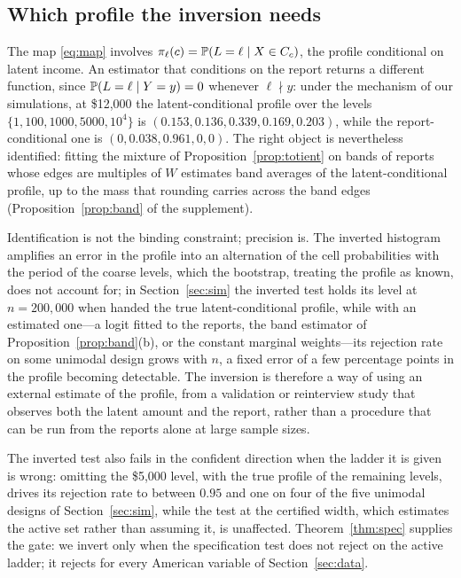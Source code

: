 \subsection{Which profile the inversion needs}

The map \eqref{eq:map} involves $\pi_\ell(c)=\mathbb{P}(L=\ell\mid X\in C_c)$, the profile conditional on latent income. An estimator that conditions on the report returns a different function, since $\mathbb{P}(L=\ell\mid Y=y)=0$ whenever $\ell\nmid y$: under the mechanism of our simulations, at \$12{,}000 the latent-conditional profile over the levels $\{1,\allowbreak 100,\allowbreak 1000,\allowbreak 5000,\allowbreak 10^4\}$ is $(0.153,\allowbreak 0.136,\allowbreak 0.339,\allowbreak 0.169,\allowbreak 0.203)$, while the report-conditional one is $(0,0.038,0.961,0,0)$. The right object is nevertheless identified: fitting the mixture of Proposition~\ref{prop:totient} on bands of reports whose edges are multiples of $W$ estimates band averages of the latent-conditional profile, up to the mass that rounding carries across the band edges (Proposition~\ref{prop:band} of the supplement).

Identification is not the binding constraint; precision is. The inverted histogram amplifies an error in the profile into an alternation of the cell probabilities with the period of the coarse levels, which the bootstrap, treating the profile as known, does not account for; in Section~\ref{sec:sim} the inverted test holds its level at $n=200{,}000$ when handed the true latent-conditional profile, while with an estimated one---a logit fitted to the reports, the band estimator of Proposition~\ref{prop:band}(b), or the constant marginal weights---its rejection rate on some unimodal design grows with $n$, a fixed error of a few percentage points in the profile becoming detectable. The inversion is therefore a way of using an external estimate of the profile, from a validation or reinterview study that observes both the latent amount and the report, rather than a procedure that can be run from the reports alone at large sample sizes.

The inverted test also fails in the confident direction when the ladder it is given is wrong: omitting the \$5{,}000 level, with the true profile of the remaining levels, drives its rejection rate to between $0.95$ and one on four of the five unimodal designs of Section~\ref{sec:sim}, while the test at the certified width, which estimates the active set rather than assuming it, is unaffected. Theorem~\ref{thm:spec} supplies the gate: we invert only when the specification test does not reject on the active ladder; it rejects for every American variable of Section~\ref{sec:data}.

